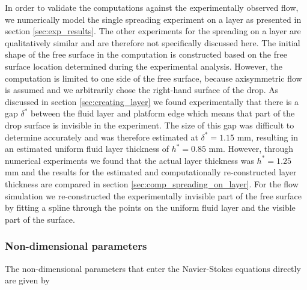 \documentclass[aip,graphicx]{revtex4-1}
\begin{document}
In order to validate the computations against the experimentally
observed flow, we numerically model the single spreading experiment
on a layer as presented in section \ref{sec:exp_results}.
The other experiments for the spreading on a layer are qualitatively
similar and are therefore not specifically discussed here.  The initial
shape of the free surface in the computation is constructed based on
the free surface location determined during the experimental analysis.
However, the computation is limited to one side of the free surface,
because axisymmetric flow is assumed and we arbitrarily chose the
right-hand surface of the drop.  As discussed in section
\ref{sec:creating_layer} we found experimentally that there is a gap
$\delta^*$ between the fluid layer and platform edge which means that
part of the drop surface is invisible in the experiment.  The size of this gap was
difficult to determine accurately and was therefore estimated at
$\delta^*=1.15$ mm, resulting in an estimated uniform fluid layer
thickness of $h^*=0.85$ mm.  However, through numerical experiments we
found that the actual layer thickness was $h^*=1.25$ mm and the
results for the estimated and computationally re-constructed layer
thickness are compared in section \ref{sec:comp_spreading_on_layer}.
For the flow simulation we re-constructed the experimentally invisible
part of the free surface by fitting a spline through the points on the
uniform fluid layer and the visible part of the surface.

\subsubsection{Non-dimensional parameters}

The non-dimensional
parameters that enter the Navier-Stokes equations directly are given
by
\end{document}
